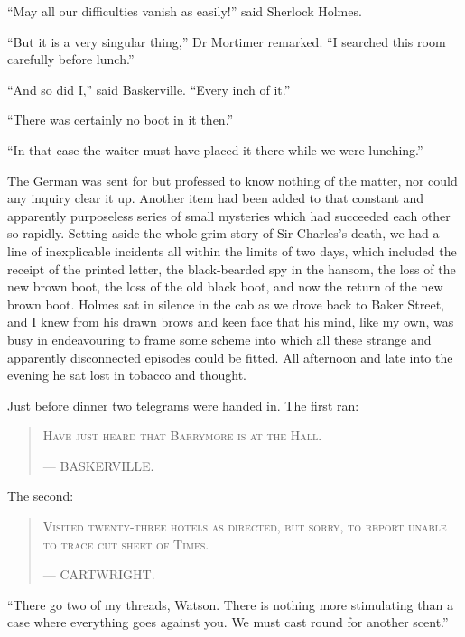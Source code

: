 \documentclass[paper=5.5in:8.5in,BCOR=7mm,twoside,DIV=calc,12pt,usegeometry,openany,chapterprefix,endperiod]{scrbook} %
\begin{document}
\enquote{May all our difficulties vanish as easily!} said Sherlock Holmes.

\enquote{But it is a very singular thing,} Dr Mortimer remarked. \enquote{I searched this room carefully before lunch.}

\enquote{And so did I,} said Baskerville. \enquote{Every inch of it.}

\enquote{There was certainly no boot in it then.}

\enquote{In that case the waiter must have placed it there while we were lunching.}

The German was sent for but professed to know nothing of the matter, nor could any inquiry clear it up. Another item had been added to that constant and apparently purposeless series of small mysteries which had succeeded each other so rapidly. Setting aside the whole grim story of Sir Charles's death, we had a line of inexplicable incidents all within the limits of two days, which included the receipt of the printed letter, the black-bearded spy in the hansom, the loss of the new brown boot, the loss of the old black boot, and now the return of the new brown boot. Holmes sat in silence in the cab as we drove back to Baker Street, and I knew from his drawn brows and keen face that his mind, like my own, was busy in endeavouring to frame some scheme into which all these strange and apparently disconnected episodes could be fitted. All afternoon and late into the evening he sat lost in tobacco and thought.

Just before dinner two telegrams were handed in. The first ran:
\begin{samepage}
\blockquote{
\textsc{Have just heard that Barrymore is at the Hall.}
\begin{flushright}
\nobreakdash--- {\small\scshape BASKERVILLE.}
\end{flushright} 
}
\end{samepage}

The second:
\begin{samepage}
\blockquote{
\textsc{Visited twenty-three hotels as directed, but sorry, to report unable to trace cut sheet of Times.}
\begin{flushright}
\nobreakdash--- {\small\scshape CARTWRIGHT.}
\end{flushright}
}
\end{samepage}

\enquote{There go two of my threads, Watson. There is nothing more stimulating than a case where everything goes against you. We must cast round for another scent.}
\end{document}
